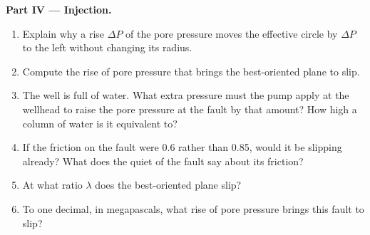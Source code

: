 \begin{problem}
\medskip
\noindent\textbf{Part IV --- Injection.}
\begin{enumerate}[resume]
  \item Explain why a rise $\Delta P$ of the pore pressure moves the effective
        circle by $\Delta P$ to the left without changing its radius.
  \item Compute the rise of pore pressure that brings the best-oriented plane
        to slip.
  \item The well is full of water. What extra pressure must the pump apply at
        the wellhead to raise the pore pressure at the fault by that amount?
        How high a column of water is it equivalent to?
  \item If the friction on the fault were 0.6 rather than 0.85, would it be
        slipping already? What does the quiet of the fault say about its
        friction?
  \item At what ratio $\lambda$ does the best-oriented plane slip?
  \item To one decimal, in megapascals, what rise of pore pressure brings this
        fault to slip?
\end{enumerate}
\end{problem}
